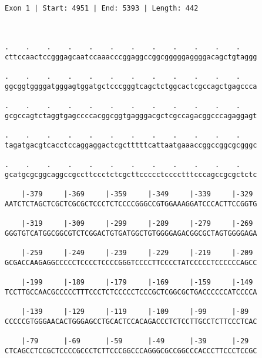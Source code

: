 \documentclass{article}
\begin{document}
 \begin{Verbatim}
 
Exon 1 | Start: 4951 | End: 5393 | Length: 442



.    .    .    .    .    .    .    .    .    .    .    .    
cttccaactccgggagcaatccaaacccggaggccggcgggggaggggacagctgtaggg
                                                            
.    .    .    .    .    .    .    .    .    .    .    .    
ggcggtggggatgggagtggatgctcccgggtcagctctggcactcgccagctgagccca
                                                            
.    .    .    .    .    .    .    .    .    .    .    .    
gcgccagtctaggtgagccccacggcggtgagggacgctcgccagacggcccagaggagt
                                                            
.    .    .    .    .    .    .    .    .    .    .    .    
tagatgacgtcacctccaggaggactcgctttttcattaatgaaaccggccggcgcgggc
                                                            
.    .    .    .    .    .    .    .    .    .    .    .    
gcatgcgcggcaggccgccttccctctcgcttccccctcccctttcccagccgcgctctc
                                                            
    |-379     |-369     |-359     |-349     |-339     |-329 
AATCTCTAGCTCGCTCGCGCTCCCTCTCCCCGGGCCGTGGAAAGGATCCCACTTCCGGTG
                                                            
    |-319     |-309     |-299     |-289     |-279     |-269 
GGGTGTCATGGCGGCGTCTCGGACTGTGATGGCTGTGGGGAGACGGCGCTAGTGGGGAGA
                                                            
    |-259     |-249     |-239     |-229     |-219     |-209 
GCGACCAAGAGGCCCCCTCCCCTCCCCGGGTCCCCTTCCCCTATCCCCCTCCCCCCAGCC
                                                            
    |-199     |-189     |-179     |-169     |-159     |-149 
TCCTTGCCAACGCCCCCTTTCCCTCTCCCCCTCCCGCTCGGCGCTGACCCCCCATCCCCA
                                                            
    |-139     |-129     |-119     |-109     |-99      |-89  
CCCCCGTGGGAACACTGGGAGCCTGCACTCCACAGACCCTCTCCTTGCCTCTTCCCTCAC
                                                            
    |-79      |-69      |-59      |-49      |-39      |-29  
CTCAGCCTCCGCTCCCCGCCCTCTTCCCGGCCCAGGGCGCCGGCCCACCCTTCCCTCCGC
                                                            

\end{Verbatim}
\end{document}
